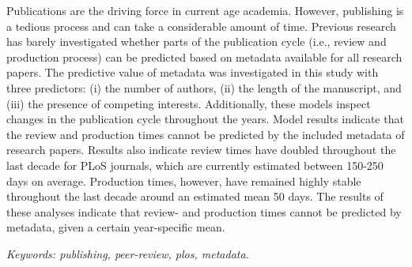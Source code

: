 Publications are the driving force in current age academia. However, publishing is a tedious process and can take a considerable amount of time. Previous research has barely investigated whether parts of the publication cycle (i.e., review and production process) can be predicted based on metadata available for all research papers. The predictive value of metadata was investigated in this study with three predictors: (i) the number of authors, (ii) the length of the manuscript, and (iii) the presence of competing interests. Additionally, these models inspect changes in the publication cycle throughout the years. Model results indicate that the review and production times cannot be predicted by the included metadata of research papers. Results also indicate review times have doubled throughout the last decade for PLoS journals, which are currently estimated between 150-250 days on average. Production times, however, have remained highly stable throughout the last decade around an estimated mean 50 days. The results of these analyses indicate that review- and production times cannot be predicted by metadata, given a certain year-specific mean.
  
\textit{Keywords: publishing, peer-review, plos, metadata.}
  
  